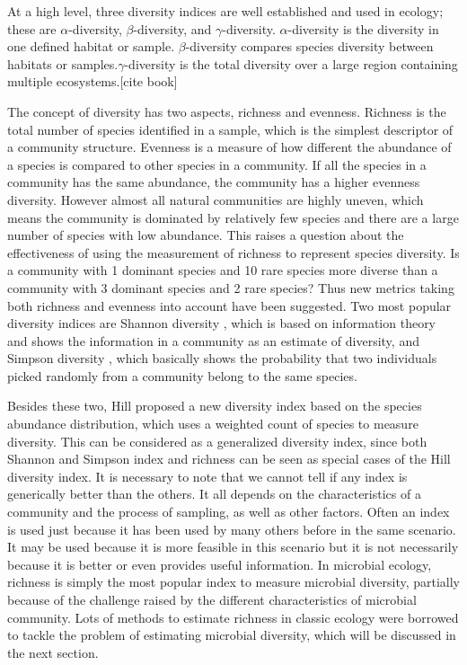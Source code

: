 At a high level, three diversity indices are well established and used in
ecology; these are $\alpha$-diversity, $\beta$-diversity, and
$\gamma$-diversity. $\alpha$-diversity is the diversity in one defined habitat
or sample. $\beta$-diversity compares species diversity between habitats or
samples.$\gamma$-diversity is the total diversity over a large region
containing multiple ecosystems.[cite book]

The concept of diversity has two aspects, richness and evenness. Richness is
the total number of species identified in a sample, which is the simplest
descriptor of a community structure. Evenness is a measure of how different the
abundance of a species is compared to other species in a community. If all the
species in a community has the same abundance, the community has a higher
evenness diversity. However almost all natural communities are highly uneven,
which means the community is dominated by relatively few species and there are
a large number of species with low abundance. This raises a question about the
effectiveness of using the measurement of richness to represent species
diversity. Is a community with 1 dominant species and 10 rare species more
diverse than a community with 3 dominant species and 2 rare species? Thus new
metrics taking both richness and evenness into account have been suggested. Two
most popular diversity indices are Shannon diversity
\cite{shannon2001mathematical}, which is based on information theory and shows
the information in a community as an estimate of diversity, and Simpson
diversity \cite{simpson1949measurement}, which basically shows the probability
that two individuals picked randomly from a community belong to the same
species.

Besides these two, Hill \cite{hill1973diversity} proposed a new diversity index
based on the species abundance distribution, which uses a weighted count of
species to measure diversity. This can be considered as a generalized diversity
index, since both Shannon and Simpson index and richness can be seen as special
cases of the Hill diversity index. It is necessary to note that we cannot tell
if any index is generically better than the others. It all depends on the
characteristics of a community and the process of sampling, as well as other
factors. Often an index is used just because it has been used by many others
before in the same scenario. It may be used because it is more feasible in this
scenario but it is not necessarily because it is better or even provides useful
information.
% 
In microbial ecology, richness is simply the most popular index to measure
microbial diversity, partially because of the challenge raised by the different
characteristics of microbial community. Lots of methods to estimate richness in
classic ecology were borrowed to tackle the problem of estimating microbial
diversity, which will be discussed in the next section.
%
